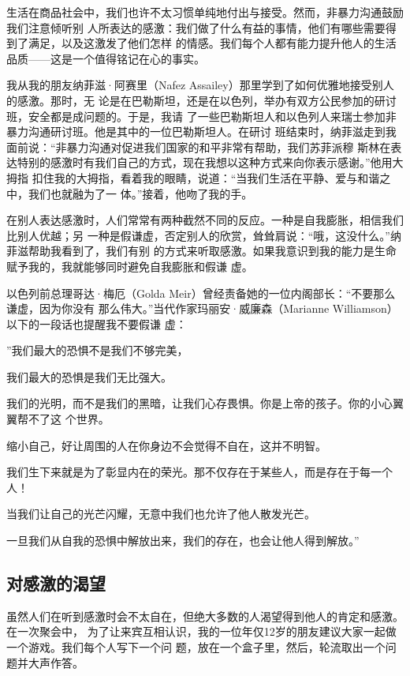 \documentclass{ctexart}
\renewenvironment{quotation}{\setlength{\parskip}{0.5em}\setstretch{1.5}\kaishu\zihao{-5}\setlength{\parindent}{1em}}{\vspace{1em}}
\begin{document}
生活在商品社会中，我们也许不太习惯单纯地付出与接受。然而，非暴力沟通鼓励我们注意倾听别
人所表达的感激：我们做了什么有益的事情，他们有哪些需要得到了满足，以及这激发了他们怎样
的情感。我们每个人都有能力提升他人的生活品质------这是一个值得铭记在心的事实。

我从我的朋友纳菲滋·阿赛里（Nafez Assailey）那里学到了如何优雅地接受别人的感激。那时，无
论是在巴勒斯坦，还是在以色列，举办有双方公民参加的研讨班，安全都是成问题的。于是，我请
了一些巴勒斯坦人和以色列人来瑞士参加非暴力沟通研讨班。他是其中的一位巴勒斯坦人。在研讨
班结束时，纳菲滋走到我面前说：``非暴力沟通对促进我们国家的和平非常有帮助，我们苏菲派穆
斯林在表达特别的感激时有我们自己的方式，现在我想以这种方式来向你表示感谢。''他用大拇指
扣住我的大拇指，看着我的眼睛，说道：``当我们生活在平静、爱与和谐之中，我们也就融为了一
体。''接着，他吻了我的手。

在别人表达感激时，人们常常有两种截然不同的反应。一种是自我膨胀，相信我们比别人优越；另
一种是假谦虚，否定别人的欣赏，耸耸肩说：``哦，这没什么。''纳菲滋帮助我看到了，我们有别
的方式来听取感激。如果我意识到我的能力是生命赋予我的，我就能够同时避免自我膨胀和假谦
虚。

以色列前总理哥达·梅厄（Golda Meir）曾经责备她的一位内阁部长：``不要那么谦虚，因为你没有
那么伟大。''当代作家玛丽安·威廉森（Marianne Williamson）以下的一段话也提醒我不要假谦
虚：


\begin{quotation}
	''我们最大的恐惧不是我们不够完美，

	我们最大的恐惧是我们无比强大。

	我们的光明，而不是我们的黑暗，让我们心存畏惧。你是上帝的孩子。你的小心翼翼帮不了这
	个世界。

	缩小自己，好让周围的人在你身边不会觉得不自在，这并不明智。

	我们生下来就是为了彰显内在的荣光。那不仅存在于某些人，而是存在于每一个人！

	当我们让自己的光芒闪耀，无意中我们也允许了他人散发光芒。

	一旦我们从自我的恐惧中解放出来，我们的存在，也会让他人得到解放。''
\end{quotation}


\subsection{对感激的渴望}

虽然人们在听到感激时会不太自在，但绝大多数的人渴望得到他人的肯定和感激。在一次聚会中，
为了让来宾互相认识，我的一位年仅12岁的朋友建议大家一起做一个游戏。我们每个人写下一个问
题，放在一个盒子里，然后，轮流取出一个问题并大声作答。
\end{document}
